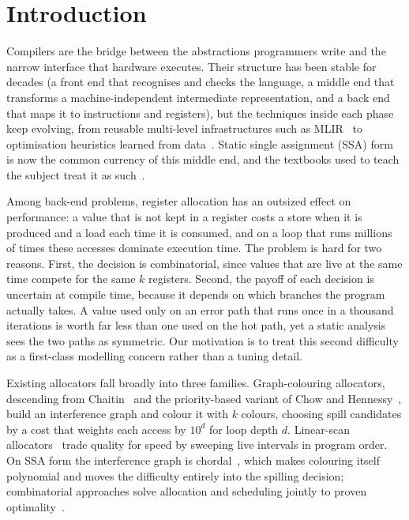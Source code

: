 \documentclass[conference]{IEEEtran}
\begin{document}
\section{Introduction}
\label{sec:intro}

Compilers are the bridge between the abstractions programmers write and
the narrow interface that hardware executes. Their structure has been
stable for decades (a front end that recognises and checks the
language, a middle end that transforms a machine-independent
intermediate representation, and a back end that maps it to
instructions and registers), but the techniques inside each phase keep
evolving, from reusable multi-level infrastructures such as
MLIR~\cite{lattner2021mlir} to optimisation heuristics learned from
data~\cite{wang2018ml,ashouri2018survey,leather2020ml}. Static single
assignment (SSA) form~\cite{cytron1991ssa,rastello2022ssa} is now the
common currency of this middle end, and the textbooks used to teach the
subject treat it as such~\cite{cooper2022eac,aho2006dragon}.

Among back-end problems, register allocation has an outsized effect on
performance: a value that is not kept in a register costs a store when
it is produced and a load each time it is consumed, and on a loop that
runs millions of times these accesses dominate execution time. The
problem is hard for two reasons. First, the decision is combinatorial,
since values that are live at the same time compete for the same $k$
registers. Second, the payoff of each decision is uncertain at compile
time, because it depends on which branches the program actually takes.
A value used only on an error path that runs once in a thousand
iterations is worth far less than one used on the hot path, yet a
static analysis sees the two paths as symmetric. Our motivation is to
treat this second difficulty as a first-class modelling concern rather
than a tuning detail.

Existing allocators fall broadly into three families. Graph-colouring
allocators, descending from Chaitin~\cite{chaitin1982} and the
priority-based variant of Chow and Hennessy~\cite{chow1990}, build an
interference graph and colour it with $k$ colours, choosing spill
candidates by a cost that weights each access by $10^{d}$ for loop depth
$d$. Linear-scan allocators~\cite{poletto1999} trade quality for speed
by sweeping live intervals in program order. On SSA form the
interference graph is chordal~\cite{hack2006ssa,hack2006ipl}, which makes
colouring itself polynomial and moves the difficulty entirely into the
spilling decision; combinatorial approaches solve allocation and
scheduling jointly to proven optimality~\cite{lozano2019toplas,lozano2019survey}.
\end{document}

